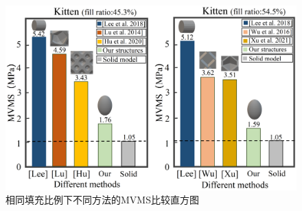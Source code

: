 \begin{figure}[htbp]
  \begin {center}
  \includegraphics[width=0.8 \textwidth]{./figures/self-support/fig14.png}
  \caption{相同填充比例下不同方法\cite{xu2021support,10.1145/2601097.2601168,wu2016self,hu2020efficient}的MVMS比较直方图}
  \label{fig:14}
  \end {center}
\end{figure}

